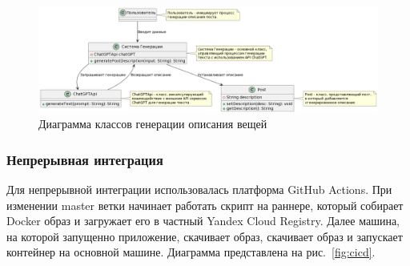\begin{figure}[htb]
	\centering
	\includegraphics[width=.95\textwidth]{images/generating-diagram.png}
	\parskip=6pt
	\caption{Диаграмма классов генерации описания вещей}
	\label{fig:generatingDiagram}
\end{figure}

\subsubsection{Непрерывная интеграция}

Для непрерывной интеграции использовалась платформа GitHub Actions. При изменении master ветки начинает работать скрипт на раннере, который собирает Docker образ и загружает его в частный Yandex Cloud Registry. Далее машина, на которой запущенно приложение, скачивает образ, скачивает образ и запускает контейнер на основной машине. Диаграмма представлена на рис.~\ref{fig:cicd}.

